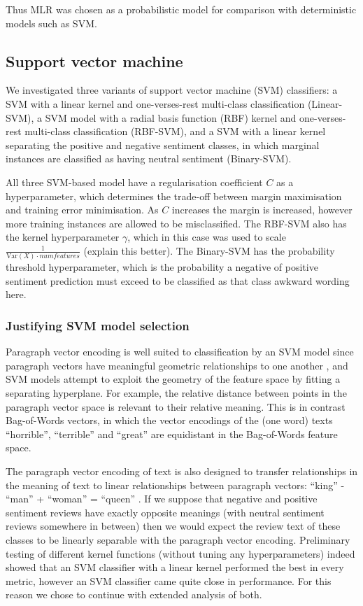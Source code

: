 \documentclass[11pt]{article}
\newcommand{\drafting}[1]{\textcolor{OliveGreen}{#1}}
\begin{document}
\drafting{
Thus MLR was chosen as a probabilistic model for comparison with deterministic models such as SVM.
}

\subsection{Support vector machine} \label{subsec:method-svm}
We investigated three variants of support vector machine (SVM) classifiers: a SVM with a linear kernel and one-verses-rest multi-class classification (Linear-SVM), a SVM model with a radial basis function (RBF) kernel and one-verses-rest multi-class classification (RBF-SVM), and a SVM with a linear kernel separating the positive and negative sentiment classes, in which marginal instances are classified as having neutral sentiment (Binary-SVM). 

All three SVM-based model have a regularisation coefficient $C$ as a hyperparameter, which determines the trade-off between margin maximisation and training error minimisation. As $C$ increases the margin is increased, however more training instances are allowed to be misclassified. The RBF-SVM also has the kernel hyperparameter $\gamma$, which in this case was used to scale $\frac{1}{\textrm{Var}(X) \cdot numfeatures}$ (\drafting{explain this better}). The Binary-SVM has the probability threshold hyperparameter, which is the probability a negative of positive sentiment prediction must exceed to be classified as that class \drafting{awkward wording here}.

\subsubsection*{Justifying SVM model selection}
Paragraph vector encoding is well suited to classification by an SVM model since paragraph vectors have meaningful geometric relationships to one another \cite{le_distributed_2014}, and SVM models attempt to exploit the geometry of the feature space by fitting a separating hyperplane. For example, the relative distance between points in the paragraph vector space is relevant to their relative meaning. This is in contrast Bag-of-Words vectors, in which the vector encodings of the (one word) texts ``horrible'', ``terrible'' and ``great'' are equidistant in the Bag-of-Words feature space.

The paragraph vector encoding of text is also designed to transfer relationships in the meaning of text to linear relationships between paragraph vectors: ``king'' - ``man'' + ``woman'' = ``queen'' \cite{le_distributed_2014}. If we suppose that negative and positive sentiment reviews have exactly opposite meanings (with neutral sentiment reviews somewhere in between) then we would expect the review text of these classes to be linearly separable with the paragraph vector encoding. Preliminary testing of different kernel functions (without tuning any hyperparameters) indeed showed that an SVM classifier with a linear kernel performed the best in every metric, however an SVM classifier came quite close in performance. For this reason we chose to continue with extended analysis of both.
\end{document}
